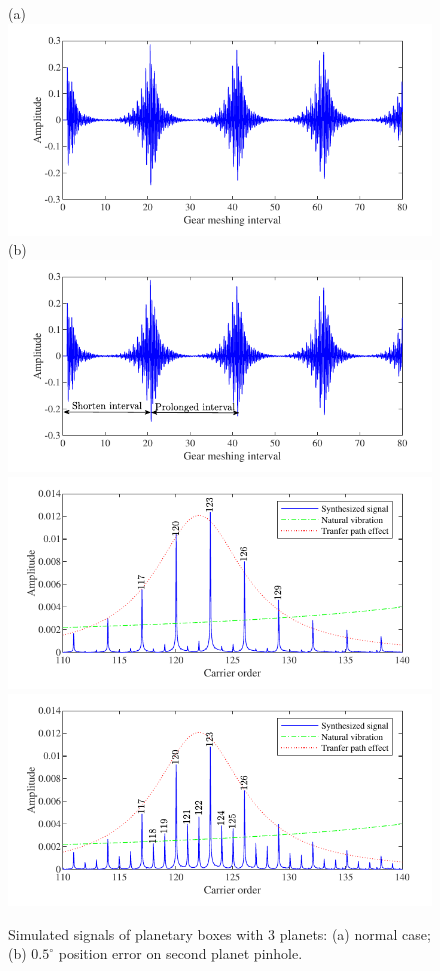 \documentclass[a4paper,fleqn]{cas-sc}%
\begin{document}
\begin{figure}[pos=htbp]
    \centering
    (a) \includegraphics[scale=\myscale,valign=t]{Time_p3_normal.pdf}
    (b) \includegraphics[scale=\myscale,valign=t]{Time_p3_fault.pdf}\\
    \hspace*{1.5em}\includegraphics[scale=\myscale,valign=t]{Freq_p3_normal.pdf}
    \hspace*{1.5em}\includegraphics[scale=\myscale,valign=t]{Freq_p3_fault.pdf}
    \caption{Simulated signals of planetary boxes with 3 planets: (a) normal case; (b) $0.5^\circ$ position error on second planet pinhole.}
    \label{fig:simulated_p3}
\end{figure}
\end{document}

